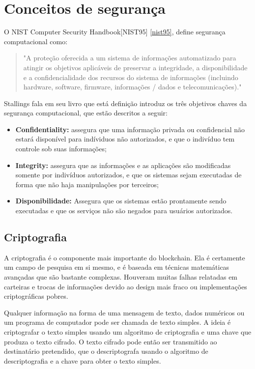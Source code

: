 
\section{Conceitos de segurança}

    O NIST Computer Security Handbook[NIST95] \ref{nist95}, define segurança computacional como:
    
     \begin{quote}
        "A proteção oferecida a um sistema de informações automatizado para atingir os objetivos aplicáveis de preservar a integridade, a disponibilidade e a confidencialidade dos recursos do sistema de informações (incluindo hardware, software, firmware, informações / dados e telecomunicações)."
     \end{quote}
     
     Stallings fala em seu livro \cite{cryptograpy_and_network_stallings} que está definição introduz os três objetivos chaves da segurança computacional, que estão descritos a seguir:
        
        \begin{itemize}
            \item \textbf{Confidentiality:} assegura que uma informação privada ou confidencial não estará disponível para indíviduos não autorizados, e que o indivíduo tem controle sob suas informações;
            \item \textbf{Integrity:} assegura que as informações e as aplicações são modificadas somente por indivíduos autorizados, e que os sistemas sejam executadas de forma que não haja manipulações por terceiros;
            \item \textbf{Disponibilidade:} Assegura que os sistemas estão prontamente sendo executadas e que os serviços não são negados para usuários autorizados.
        \end{itemize}

    \subsection{Criptografia}
    
    A criptografia é o componente mais importante do blockchain. Ela é certamente um campo de pesquisa em si mesmo, e é baseada em técnicas matemáticas avançadas que são bastante complexas. Houveram muitas falhas relatadas em carteiras e trocas de informações devido ao design mais fraco ou implementações criptográficas pobres.\cite{beginnig_blockchain_bikramaditya}
    
    Qualquer informação na forma de uma mensagem de texto, dados numéricos ou um programa de computador pode ser chamada de texto simples. A ideia é criptografar o texto simples usando um algoritmo de criptografia e uma chave que produza o texto cifrado. O texto cifrado pode então ser transmitido ao destinatário pretendido, que o descriptografa usando o algoritmo de descriptografia e a chave para obter o texto simples.\cite{beginnig_blockchain_bikramaditya}
    
